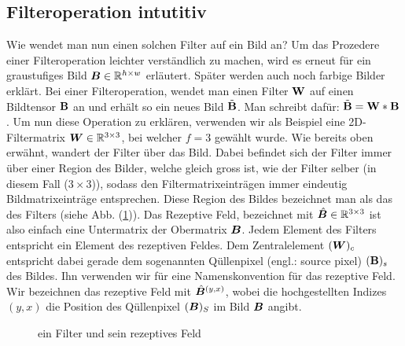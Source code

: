 \subsection{Filteroperation intutitiv}\label{sec:filteroperation_intuitiv}
Wie wendet man nun einen solchen Filter auf ein Bild an? Um das Prozedere einer
Filteroperation leichter verständlich zu machen, wird es erneut für ein
graustufiges Bild $\bm{B} \in \mathbb{R}^{h \times w}$ erläutert. Später werden auch noch farbige
Bilder erklärt.
\para{}
Bei einer Filteroperation, wendet man einen Filter $\mathbf{W}$ auf einen Bildtensor
$\mathbf{B}$ an und erhält so ein neues Bild $\tilde{\mathbf{B}}$. Man schreibt dafür:
$\tilde{\mathbf{B}} = \mathbf{W} * \mathbf{B}$.
\para{}
Um nun diese Operation zu erklären, verwenden wir als Beispiel eine
2D-Filtermatrix $\bm{W} \in \mathbb{R}^{3 \times 3}$, bei welcher
$f = 3$ gewählt wurde.
Wie bereits oben erwähnt, wandert der Filter über das Bild. Dabei befindet
sich der Filter immer über einer Region des Bilder, welche gleich gross ist,
wie der Filter selber (in diesem Fall ($3 \times 3$)), sodass den Filtermatrixeinträgen immer eindeutig
Bildmatrixeinträge entsprechen. Diese Region des Bildes bezeichnet man als das
 des Filters (siehe Abb. (\ref{fig:receptive_field})).
Das Rezeptive Feld, bezeichnet mit $\hat{\bm{B}} \in \mathbb{R}^{3 \times 3}$ ist also einfach eine
Untermatrix der Obermatrix $\bm{B}$.
\para{}
Jedem Element des Filters entspricht ein Element des rezeptiven Feldes. Dem
Zentralelement $(\bm{W})_c$ entspricht dabei gerade dem sogenannten Qüllenpixel
(engl.: source pixel) $(\mathbf{B})_s$ des Bildes. Ihn verwenden wir für eine
Namenskonvention für das rezeptive Feld. Wir bezeichnen das rezeptive Feld mit
$\hat{\bm{B}}^{(y,x)}$, wobei die hochgestellten Indizes $(y,x)$ die Position
des Qüllenpixel $(\bm{B})_S$ im Bild $\bm{B}$ angibt.

\begin{figure}[h!]

  \caption{ein Filter und sein rezeptives Feld}
  \label{fig:receptive_field}
\end{figure}

